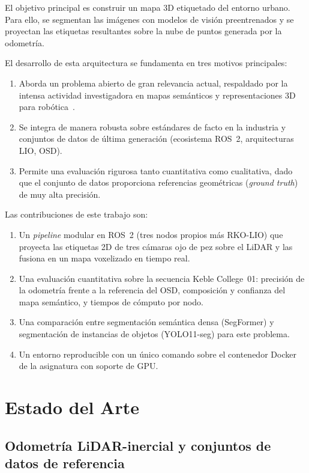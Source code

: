 \documentclass[11pt, twoside]{article}
\begin{document}
El objetivo principal es construir un mapa 3D etiquetado del entorno urbano. Para ello, se segmentan las imágenes con modelos de visión preentrenados y se proyectan las etiquetas resultantes sobre la nube de puntos generada por la odometría.

El desarrollo de esta arquitectura se fundamenta en tres motivos principales:
\begin{enumerate}[noitemsep]
  \item Aborda un problema abierto de gran relevancia actual, respaldado por la intensa actividad investigadora en mapas semánticos y representaciones 3D para robótica~\cite{firoozi2023foundation,deng2025best3d}.
  \item Se integra de manera robusta sobre estándares de facto en la industria y conjuntos de datos de última generación (ecosistema ROS~2, arquitecturas LIO, OSD).
  \item Permite una evaluación rigurosa tanto cuantitativa como cualitativa, dado que el conjunto de datos proporciona referencias geométricas (\emph{ground truth}) de muy alta precisión.
\end{enumerate}

Las contribuciones de este trabajo son:
\begin{enumerate}[noitemsep]
  \item Un \emph{pipeline} modular en ROS~2 (tres nodos propios más RKO-LIO) que proyecta las etiquetas 2D de tres cámaras ojo de pez sobre el LiDAR y las fusiona en un mapa voxelizado en tiempo real.
  \item Una evaluación cuantitativa sobre la secuencia Keble College~01: precisión de la odometría frente a la referencia del OSD, composición y confianza del mapa semántico, y tiempos de cómputo por nodo.
  \item Una comparación entre segmentación semántica densa (SegFormer) y segmentación de instancias de objetos (YOLO11-seg) para este problema.
  \item Un entorno reproducible con un único comando sobre el contenedor Docker de la asignatura con soporte de GPU.
\end{enumerate}

\section{Estado del Arte}

\subsection{Odometría LiDAR-inercial y conjuntos de datos de referencia}
\end{document}
